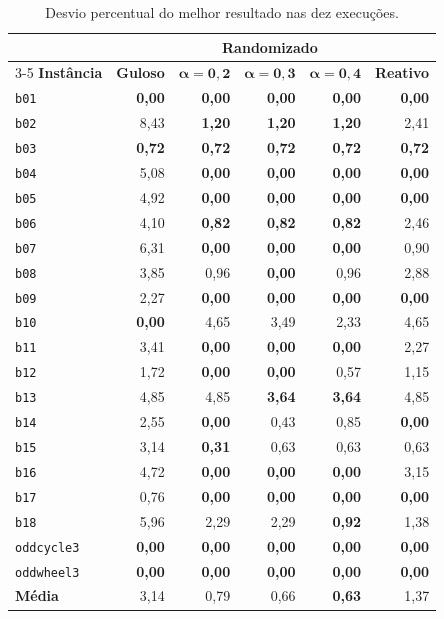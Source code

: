 \documentclass[12pt]{article}
\begin{document}
\begin{table}[htbp]
\centering
\caption{Desvio percentual do melhor resultado nas dez execuções.}
\label{tab:desvio-melhor}
\scriptsize
\setlength{\tabcolsep}{4pt}
\begin{tabular}{lrrrrr}
\toprule
& & \multicolumn{3}{c}{\textbf{Randomizado}} &\\
\cmidrule(lr){3-5}
\textbf{Instância} & \textbf{Guloso} & $\boldsymbol{\alpha=0{,}2}$ & $\boldsymbol{\alpha=0{,}3}$ & $\boldsymbol{\alpha=0{,}4}$ & \textbf{Reativo}\\
\midrule
\texttt{b01} & \textbf{0,00} & \textbf{0,00} & \textbf{0,00} & \textbf{0,00} & \textbf{0,00}\\
\texttt{b02} & 8,43 & \textbf{1,20} & \textbf{1,20} & \textbf{1,20} & 2,41\\
\texttt{b03} & \textbf{0,72} & \textbf{0,72} & \textbf{0,72} & \textbf{0,72} & \textbf{0,72}\\
\texttt{b04} & 5,08 & \textbf{0,00} & \textbf{0,00} & \textbf{0,00} & \textbf{0,00}\\
\texttt{b05} & 4,92 & \textbf{0,00} & \textbf{0,00} & \textbf{0,00} & \textbf{0,00}\\
\texttt{b06} & 4,10 & \textbf{0,82} & \textbf{0,82} & \textbf{0,82} & 2,46\\
\texttt{b07} & 6,31 & \textbf{0,00} & \textbf{0,00} & \textbf{0,00} & 0,90\\
\texttt{b08} & 3,85 & 0,96 & \textbf{0,00} & 0,96 & 2,88\\
\texttt{b09} & 2,27 & \textbf{0,00} & \textbf{0,00} & \textbf{0,00} & \textbf{0,00}\\
\texttt{b10} & \textbf{0,00} & 4,65 & 3,49 & 2,33 & 4,65\\
\texttt{b11} & 3,41 & \textbf{0,00} & \textbf{0,00} & \textbf{0,00} & 2,27\\
\texttt{b12} & 1,72 & \textbf{0,00} & \textbf{0,00} & 0,57 & 1,15\\
\texttt{b13} & 4,85 & 4,85 & \textbf{3,64} & \textbf{3,64} & 4,85\\
\texttt{b14} & 2,55 & \textbf{0,00} & 0,43 & 0,85 & \textbf{0,00}\\
\texttt{b15} & 3,14 & \textbf{0,31} & 0,63 & 0,63 & 0,63\\
\texttt{b16} & 4,72 & \textbf{0,00} & \textbf{0,00} & \textbf{0,00} & 3,15\\
\texttt{b17} & 0,76 & \textbf{0,00} & \textbf{0,00} & \textbf{0,00} & \textbf{0,00}\\
\texttt{b18} & 5,96 & 2,29 & 2,29 & \textbf{0,92} & 1,38\\
\texttt{oddcycle3} & \textbf{0,00} & \textbf{0,00} & \textbf{0,00} & \textbf{0,00} & \textbf{0,00}\\
\texttt{oddwheel3} & \textbf{0,00} & \textbf{0,00} & \textbf{0,00} & \textbf{0,00} & \textbf{0,00}\\
\midrule
\textbf{Média} & 3,14 & 0,79 & 0,66 & \textbf{0,63} & 1,37\\
\bottomrule
\end{tabular}
\end{table}
\end{document}
